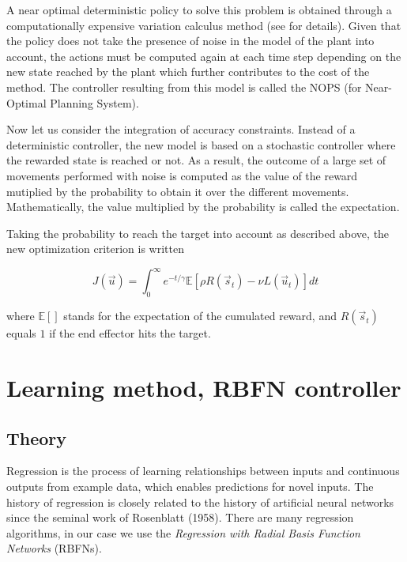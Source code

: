 \documentclass[pdftex,a4paper,11pt]{report}
\begin{document}
A near optimal deterministic policy to solve this problem is obtained through a computationally expensive variation calculus method (see \cite{rigoux_these} for details).
Given that the policy does not take the presence of noise in the model of the plant into account, 
the actions must be computed again at each time step depending on the new state reached by the plant
which further contributes to the cost of the method.
The controller resulting from this model is called the NOPS (for Near-Optimal Planning System).

Now let us consider the integration of accuracy constraints. Instead of a deterministic controller, the new model is based on a stochastic controller where the rewarded state is reached or not. As a result, the outcome of a large set of movements performed with noise is computed as the value of the reward mutiplied by the probability to obtain it over the different movements. 
Mathematically, the value multiplied by the probability is called the expectation.

Taking the probability to reach the target into account as described above, the new optimization criterion is written

\begin{equation}
\label{eq:expectation}
 J(\vec{u}) = \int_0^{\infty} e^{-t/\gamma} \mathbb{E}[ \rho R(\vec{s}_t) - \nu L(\vec{u}_t) ] dt
\end{equation}

where $\mathbb{E}[]$ stands for the expectation of the cumulated reward, and $R(\vec{s}_t)$  equals $1$ if the end effector hits the target.

\section{Learning method, RBFN controller}
\label{sec_rbfn}

\subsection{Theory}

Regression is the process of learning relationships between inputs and continuous outputs from example data, which enables predictions for novel inputs.
The history of regression is closely related to the history of artificial neural networks since the seminal work of Rosenblatt (1958).
There are many regression algorithms, in our case we use the \textit{Regression with Radial Basis Function Networks} (RBFNs).
\end{document}
